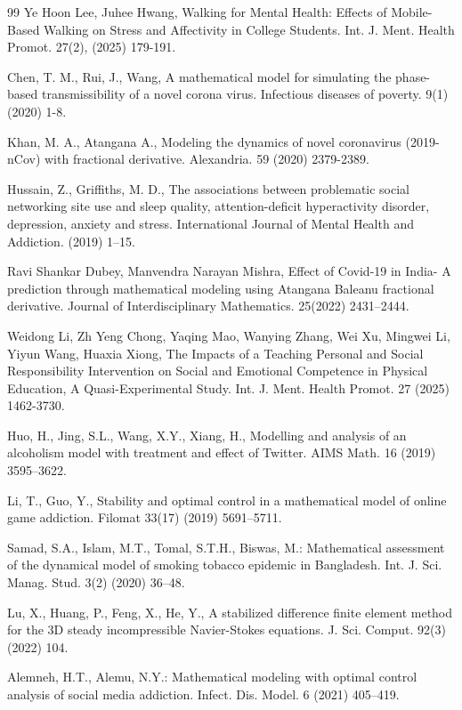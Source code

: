 \documentclass[10pt]{NSP1}
\begin{document}
\begin{thebibliography}{99}
Ye Hoon Lee, Juhee Hwang, Walking for Mental Health: Effects of Mobile-Based Walking on Stress and Affectivity in College Students. Int. J. Ment. Health Promot. 27(2), (2025) 179-191.

Chen, T. M., Rui, J., Wang, A mathematical model for simulating the phase-based transmissibility of a novel corona virus. Infectious diseases of poverty. 9(1)(2020) 1-8.

Khan, M. A., Atangana A., Modeling the dynamics of novel coronavirus (2019-nCov) with fractional derivative. Alexandria. 59 (2020) 2379-2389.

Hussain, Z., Griffiths, M. D., The associations between problematic social networking site use and sleep quality, attention-deficit hyperactivity disorder, depression, anxiety and stress. International Journal of Mental Health and Addiction. (2019) 1–15.

Ravi Shankar Dubey, Manvendra Narayan Mishra, Effect of Covid-19 in India- A prediction through mathematical modeling using Atangana Baleanu fractional derivative. Journal of Interdisciplinary Mathematics. 25(2022) 2431–2444.

Weidong Li, Zh Yeng Chong, Yaqing Mao, Wanying Zhang, Wei Xu, Mingwei Li, Yiyun Wang, Huaxia Xiong, The Impacts of a Teaching Personal and Social Responsibility Intervention on Social and Emotional Competence in Physical Education, A Quasi-Experimental Study. Int. J. Ment. Health Promot. 27 (2025) 1462-3730.

Huo, H., Jing, S.L., Wang, X.Y., Xiang, H., Modelling and analysis of an alcoholism model with treatment and effect of Twitter. AIMS Math. 16 (2019) 3595–3622.

Li, T., Guo, Y., Stability and optimal control in a mathematical model of online game addiction. Filomat 33(17) (2019) 5691–5711.

Samad, S.A., Islam, M.T., Tomal, S.T.H., Biswas, M.: Mathematical assessment of the dynamical model of smoking tobacco epidemic in Bangladesh. Int. J. Sci. Manag. Stud. 3(2) (2020) 36–48.

Lu, X., Huang, P., Feng, X., He, Y., A stabilized difference finite element method for the 3D steady incompressible Navier-Stokes equations. J. Sci. Comput. 92(3) (2022) 104.

Alemneh, H.T., Alemu, N.Y.: Mathematical modeling with optimal control analysis of social media addiction. Infect. Dis. Model. 6 (2021) 405–419.


\end{thebibliography}
\end{document}
